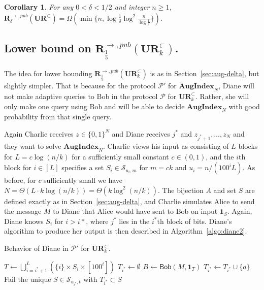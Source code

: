 \documentclass[11pt]{article}
\newtheorem{corollary}{Corollary}
\newcommand{\diane}{\mathsf{Diane}}
\newcommand{\query}{\mathsf{Bob}}
\newcommand{\aug}{\mathbf{AugIndex}\xspace}
\newcommand{\ur}{\mathbf{UR}\xspace}
\newcommand{\randcom}{\mathbf{R}}
\begin{document}
\begin{corollary}
For any $0<\delta<1/2$ and integer $n\ge 1$, $\randcom^{\rightarrow,pub}_\delta(\ur^\subset) = \Omega(\min\{n, \log\frac 1{\delta} \log^2 \frac n{\log \frac 1{\delta}}\})$.
\end{corollary}

\subsection{Lower bound on $\randcom^{\rightarrow,pub}_{\frac 15}(\ur_k^\subset)$.}\label{sec:aug-k}

The idea for lower bounding $\randcom^{\rightarrow,pub}_{\frac 15}(\ur_k^\subset)$ is as in Section~\ref{sec:aug-delta}, but slightly simpler. That is because for the protocol $\mathcal P'$ for $\aug_N$, Diane will not make adaptive queries to Bob in the protocol $\mathcal P$ for $\ur_k^\subset$. Rather, she will only make one query using Bob and will be able to decide $\aug_N$ with good probability from that single query.

Again Charlie receives $z\in\{0,1\}^N$ and Diane receives $j^*$ and $z_{j^*+1},\ldots,z_N$ and they want to solve $\aug_N$. Charlie views his input as consisting of $L$ blocks for $L = c\log(n/k)$ for a sufficiently small constant $c\in(0,1)$, and the $i$th block for $i\in[L]$ specifies a set $S_i \in \mathcal S_{u_i,m}$ for $m = ck$ and $u_i = n/(100^i L)$. As before, for $c$ sufficiently small we have $N = \Theta(L\cdot k\log(n/k)) = \Theta(k\log^2(n/k))$. The bijection $A$ and set $S$ are defined exactly as in Section~\ref{sec:aug-delta}, and Charlie simulates Alice to send the message $M$ to Diane that Alice would have sent to Bob on input $\mathbf{1}_S$. Again, Diane knows $S_i$ for $i>i*$, where $j^*$ lies in the $i^*$th block of bits. Diane's algorithm to produce her output is then described in Algorithm~\ref{algo:diane2}.

\begin{algorithm}%
  \caption{Behavior of Diane in $\mathcal P'$ for $\ur_k^\subset$.} \label{algo:diane2}
  \begin{algorithmic}[1]
    \Procedure{$\diane$}{$M$}
    \State $T \leftarrow \bigcup_{i=i^*+1}^L (\{i\} \times S_i \times [100^i])$
    \State $T_{i^*}\leftarrow \emptyset$
    \State $B\leftarrow \query(M, \mathbf{1}_T)$
        \State $T_{i^*} \leftarrow T_{i^*}\cup \{a\}$
      \EndIf
    \EndFor
      \State \Return \textsf{Fail}
    \Else
      \State \Return the unique $S\in \mathcal S_{u_{i^*},t}$ with $T_{i^*}\subset S$ 
    \EndIf
    \EndProcedure
  \end{algorithmic}
\end{algorithm}
\end{document}
